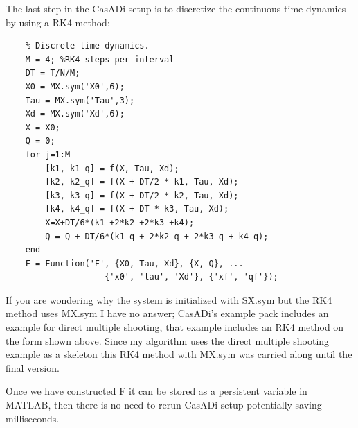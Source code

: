 The last step in the CasADi setup is to discretize the continuous time dynamics by using a \gls{RK4} method:
\begin{lstlisting}
    % Discrete time dynamics.
    M = 4; %RK4 steps per interval
    DT = T/N/M;
    X0 = MX.sym('X0',6);
    Tau = MX.sym('Tau',3);
    Xd = MX.sym('Xd',6);
    X = X0;
    Q = 0;
    for j=1:M
        [k1, k1_q] = f(X, Tau, Xd);
        [k2, k2_q] = f(X + DT/2 * k1, Tau, Xd);
        [k3, k3_q] = f(X + DT/2 * k2, Tau, Xd);
        [k4, k4_q] = f(X + DT * k3, Tau, Xd);
        X=X+DT/6*(k1 +2*k2 +2*k3 +k4);
        Q = Q + DT/6*(k1_q + 2*k2_q + 2*k3_q + k4_q);
    end
    F = Function('F', {X0, Tau, Xd}, {X, Q}, ... 
                    {'x0', 'tau', 'Xd'}, {'xf', 'qf'});
\end{lstlisting}

If you are wondering why the system is initialized with SX.sym but the RK4 method uses MX.sym I have
no answer; CasADi's example pack includes an example for direct multiple shooting, that example includes an RK4 method on the form shown above.
Since my algorithm uses the direct multiple shooting example as a skeleton this RK4 method with MX.sym was carried along until the final version.

Once we have constructed F it can be stored as a persistent variable in MATLAB, then there is no need to rerun CasADi setup potentially saving
milliseconds.



